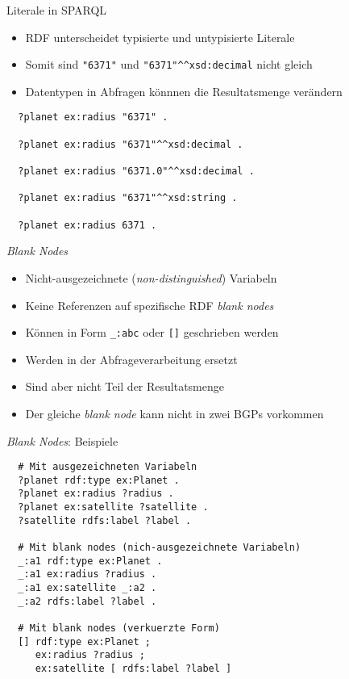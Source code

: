 \documentclass{beamer}
\begin{document}
\begin{frame}[fragile]{Literale in SPARQL}
	
	\begin{itemize}
		\item RDF unterscheidet typisierte und untypisierte Literale
		\item Somit sind \texttt{"6371"} und \texttt{"6371"\^{}\^{}xsd:decimal} nicht gleich
		\item Datentypen in Abfragen könnnen die Resultatsmenge verändern
	\end{itemize}
	
	\small
	\begin{lstlisting}
  ?planet ex:radius "6371" .
  
  ?planet ex:radius "6371"^^xsd:decimal .
  
  ?planet ex:radius "6371.0"^^xsd:decimal .
    
  ?planet ex:radius "6371"^^xsd:string .
  
  ?planet ex:radius 6371 .
		\end{lstlisting}
	
\end{frame}

\begin{frame}{\emph{Blank Nodes}}
	
	\begin{itemize}
		\item Nicht-ausgezeichnete (\emph{non-distinguished}) Variabeln
		\item Keine Referenzen auf spezifische RDF \emph{blank nodes}
		\item Können in Form \texttt{\_:abc} oder \texttt{[]} geschrieben werden
		\item Werden in der Abfrageverarbeitung ersetzt
		\item Sind aber nicht Teil der Resultatsmenge
		\item Der gleiche \emph{blank node} kann nicht in zwei BGPs vorkommen
	\end{itemize}
	
\end{frame}

\begin{frame}[fragile]{\emph{Blank Nodes}: Beispiele}
	
	\small
	\begin{lstlisting}
  # Mit ausgezeichneten Variabeln
  ?planet rdf:type ex:Planet .
  ?planet ex:radius ?radius .
  ?planet ex:satellite ?satellite .
  ?satellite rdfs:label ?label .
     
  # Mit blank nodes (nich-ausgezeichnete Variabeln)
  _:a1 rdf:type ex:Planet .
  _:a1 ex:radius ?radius .
  _:a1 ex:satellite _:a2 .
  _:a2 rdfs:label ?label .
  
  # Mit blank nodes (verkuerzte Form)
  [] rdf:type ex:Planet ;
     ex:radius ?radius ;
     ex:satellite [ rdfs:label ?label ]
	\end{lstlisting}
	
\end{frame}
\end{document}
